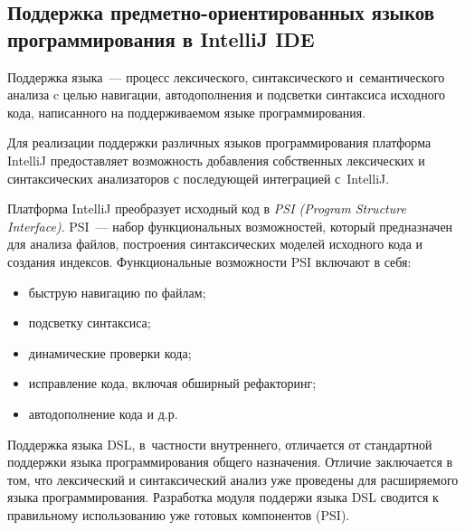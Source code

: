 \subsection{Поддержка предметно-ориентированных языков программирования в IntelliJ IDE} \label{sub132}

Поддержка языка~--- процесс лексического, синтаксического и~семантического анализа c целью навигации, автодополнения и подсветки синтаксиса исходного кода, написанного на поддерживаемом языке программирования. 

Для реализации поддержки различных языков программирования платформа IntelliJ предоставляет возможность добавления собственных лексических и синтаксических анализаторов с последующей интеграцией с~IntelliJ.

Платформа IntelliJ преобразует исходный код в \textit{PSI (Program Structure Interface)}. PSI~--- набор функциональных возможностей, который предназначен для анализа файлов, построения синтаксических моделей исходного кода и создания индексов. Функциональные возможности PSI включают в себя:

\begin{itemize}
\item{быструю навигацию по файлам;}
\item{подсветку синтаксиса;}
\item{динамические проверки кода;}
\item{исправление кода, включая обширный рефакторинг;}
\item{автодополнение кода и д.р.}
\end{itemize}

Поддержка языка DSL, в~частности внутреннего, отличается от стандартной поддержки языка программирования общего назначения. Отличие заключается в том, что лексический и синтаксический анализ уже проведены для расширяемого языка программирования. Разработка модуля поддержи языка DSL сводится к правильному использованию уже готовых компонентов (PSI).
